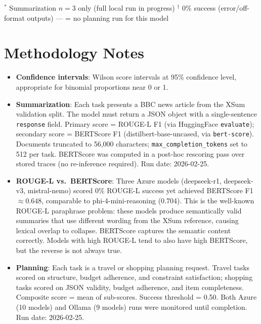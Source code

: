\documentclass[11pt,letterpaper]{article}
\begin{document}
\begin{table}[h!]
\vspace{4pt}
{\footnotesize
$^{*}$ Summarization $n=3$ only (full local run in progress) \quad
$^\dagger$ 0\% success (error/off-format outputs) \quad
--- = no planning run for this model
}
\end{table}

\vspace{0.5cm}

\section*{Methodology Notes}

\begin{itemize}
\item \textbf{Confidence intervals}: Wilson score intervals at 95\% confidence level, appropriate for binomial proportions near 0 or 1.

\item \textbf{Summarization}: Each task presents a BBC news article from the XSum validation split. The model must return a JSON object with a single-sentence \texttt{response} field. Primary score = ROUGE-L F1 (via HuggingFace \texttt{evaluate}); secondary score = BERTScore F1 (distilbert-base-uncased, via \texttt{bert-score}). Documents truncated to 56,000 characters; \texttt{max\_completion\_tokens} set to 512 per task. BERTScore was computed in a post-hoc rescoring pass over stored traces (no re-inference required). Run date: 2026-02-25.

\item \textbf{ROUGE-L vs.\ BERTScore}: Three Azure models (deepseek-r1, deepseek-v3, mistral-nemo) scored 0\% ROUGE-L success yet achieved BERTScore F1 $\approx 0.648$, comparable to phi-4-mini-reasoning (0.704). This is the well-known ROUGE-L paraphrase problem: these models produce semantically valid summaries that use different wording from the XSum reference, causing lexical overlap to collapse. BERTScore captures the semantic content correctly. Models with high ROUGE-L tend to also have high BERTScore, but the reverse is not always true.

\item \textbf{Planning}: Each task is a travel or shopping planning request. Travel tasks scored on structure, budget adherence, and constraint satisfaction; shopping tasks scored on JSON validity, budget adherence, and item completeness. Composite score = mean of sub-scores. Success threshold = 0.50. Both Azure (10 models) and Ollama (9 models) runs were monitored until completion. Run date: 2026-02-25.


\end{itemize}
\end{document}
